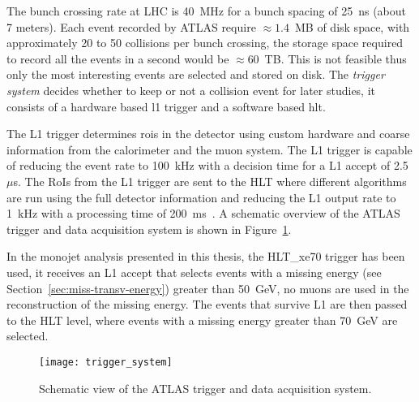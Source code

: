 The bunch crossing rate at LHC is 40~MHz for a bunch spacing of 25~ns (about 7
meters). Each event recorded by ATLAS require $\approx 1.4$~MB of disk space,
with approximately 20 to 50 collisions per bunch crossing, the storage space
required to record all the events in a second would be $\approx 60$~TB. This is
not feasible thus only the most interesting events are selected and stored on
disk. The \emph{trigger system} decides whether to keep or not a collision event
for later studies, it consists of a hardware based \gls{l1} trigger and a
software based \gls{hlt}.

The L1 trigger determines \gls{rois} in the detector using custom hardware and
coarse information from the calorimeter and the muon system. The L1 trigger is
capable of reducing the event rate to 100~kHz with a decision time for a L1
accept of 2.5~$\mu$s. The RoIs from the L1 trigger are sent to the HLT where
different algorithms are run using the full detector information and reducing
the L1 output rate to 1~kHz with a processing time of 200~ms~\cite{trigger}. A
schematic overview of the ATLAS trigger and data acquisition system is shown in
Figure~\ref{fig:trigger_system}.

In the monojet analysis presented in this thesis, the HLT\_xe70 trigger has been
used, it receives an L1 accept that selects events with a missing energy (see
Section~\ref{sec:miss-transv-energy}) greater than 50~GeV, no muons are used in
the reconstruction of the missing energy. The events that survive L1 are then
passed to the HLT level, where events with a missing energy greater than 70~GeV are
selected.

\begin{figure}[!h]
  \centering
    \texttt{[image: trigger\_system]}
    \caption{Schematic view of the ATLAS trigger and data acquisition system.}
    \label{fig:trigger_system}
\end{figure}
